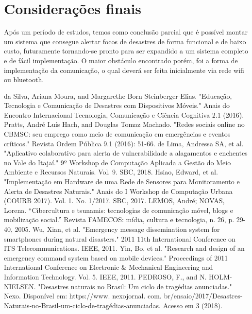 \documentclass[conference]{IEEEtran}
\begin{document}
\section{Considerações finais}

Após um período de estudos, temos como conclusão parcial que é possível montar um sistema que consegue alertar focos de desastres de forma funcional e de baixo custo, futuramente tornando-se pronto para ser expandido a um sistema completo e de fácil implementação. O maior obstáculo encontrado porém, foi a forma de implementação da comunicação, o qual deverá ser feita inicialmente via rede wifi ou bluetooth.


\begin{thebibliography}{00}
 da Silva, Ariana Moura, and Margarethe Born Steinberger-Elias. "Educação, Tecnologia e Comunicação de Desastres com Dispositivos Móveis." Anais do Encontro Internacional Tecnologia, Comunicação e Ciência Cognitiva 2.1 (2016).
 Pratts, André Luís Hach, and Douglas Tomaz Machado. "Redes sociais online no CBMSC: seu emprego como meio de comunicação em emergências e eventos críticos." Revista Ordem Pública 9.1 (2016): 51-66.
 de Lima, Andressa SA, et al. "Aplicativo colaborativo para alerta de vulnerabilidade a alagamentos e enchentes no Vale do Itajaí." 9º Workshop de Computação Aplicada a Gestão do Meio Ambiente e Recursos Naturais. Vol. 9. SBC, 2018.
 Hsiao, Edward, et al. "Implementação em Hardware de uma Rede de Sensores para Monitoramento e Alerta de Desastres Naturais." Anais do I Workshop de Computação Urbana (COURB 2017). Vol. 1. No. 1/2017. SBC, 2017.
 LEMOS, André; NOVAS, Lorena. “Cibercultura e tsunamis: tecnologias de comunicação móvel, blogs e mobilização social.” Revista FAMECOS: mídia, cultura e tecnologia, n. 26, p. 29-40, 2005.
 Wu, Xian, et al. "Emergency message dissemination system for smartphones during natural disasters." 2011 11th International Conference on ITS Telecommunications. IEEE, 2011.
 Yin, Bo, et al. "Research and design of an emergency command system based on mobile devices." Proceedings of 2011 International Conference on Electronic \& Mechanical Engineering and Information Technology. Vol. 5. IEEE, 2011.
 PEDROSO, F., and N. HOLM-NIELSEN. "Desastres naturais no Brasil: Um ciclo de tragédias anunciadas." Nexo. Disponível em: https://www. nexojornal. com. br/ensaio/2017/Desastres-Naturais-no-Brasil-um-ciclo-de-tragédias-anunciadas. Acesso em 3 (2018).
\end{thebibliography}
\vspace{12pt}
\end{document}
